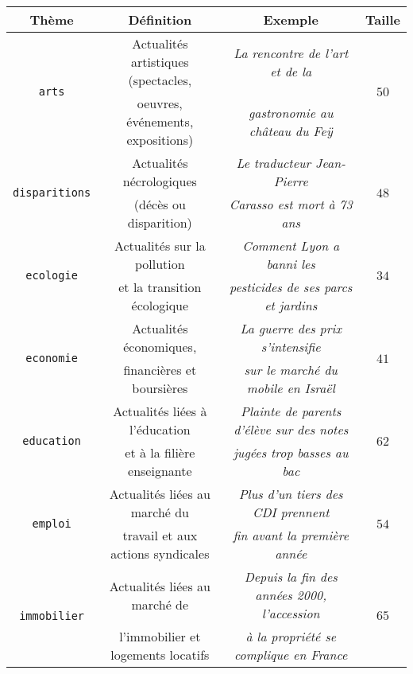 	\begin{table}[!htb]
		\begin{center}
		\begin{scriptsize}
		\begin{tabular}{|c|c|c|c|}
		
			\hline
			\rowcolor{colorTableHeader!15}
			\textbf{Thème}
				& \textbf{Définition}
				& \textbf{Exemple}
				& \textbf{Taille}
				\tabularnewline
				\hline
			
			\multirow{2}{*}{\texttt{arts}}
				& Actualités artistiques (spectacles,
				& \textit{La rencontre de l'art et de la }
				& \multirow{2}{*}{$50$}
				\tabularnewline
				& oeuvres, événements, expositions)
				& \textit{gastronomie au château du Feÿ}
				&
				\tabularnewline
				\hline
			\multirow{2}{*}{\texttt{disparitions}}
				& Actualités nécrologiques 
				& \textit{Le traducteur Jean-Pierre}
				& \multirow{2}{*}{$48$}
				\tabularnewline
				& (décès ou disparition)
				& \textit{Carasso est mort à 73 ans}
				&
				\tabularnewline
				\hline
			\multirow{2}{*}{\texttt{ecologie}}
				& Actualités sur la pollution
				& \textit{Comment Lyon a banni les}
				& \multirow{2}{*}{$34$}
				\tabularnewline
				& et la transition écologique
				& \textit{pesticides de ses parcs et jardins}
				&
				\tabularnewline
				\hline
			\multirow{2}{*}{\texttt{economie}}
				& Actualités économiques,
				& \textit{La guerre des prix s'intensifie}
				& \multirow{2}{*}{$41$}
				\tabularnewline
				& financières et boursières
				& \textit{sur le marché du mobile en Israël}
				&
				\tabularnewline
				\hline
			\multirow{2}{*}{\texttt{education}}
				& Actualités liées à l'éducation
				& \textit{Plainte de parents d'élève sur des notes}
				& \multirow{2}{*}{$62$}
				\tabularnewline
				& et à la filière enseignante
				& \textit{jugées trop basses au bac}
				&
				\tabularnewline
				\hline
			\multirow{2}{*}{\texttt{emploi}}
				& Actualités liées au marché du
				& \textit{Plus d'un tiers des CDI prennent}
				& \multirow{2}{*}{$54$}
				\tabularnewline
				& travail et aux actions syndicales
				& \textit{ fin avant la première année}
				&
				\tabularnewline
				\hline
			\multirow{2}{*}{\texttt{immobilier}}
				& Actualités liées au marché de
				& \textit{Depuis la fin des années 2000, l'accession}
				& \multirow{2}{*}{$65$}
				\tabularnewline
				& l'immobilier et logements locatifs
				& \textit{à la propriété se complique en France}

\end{tabular}
\end{scriptsize}
\end{center}
\end{table}
